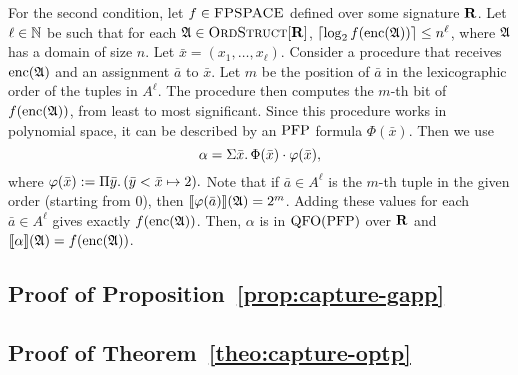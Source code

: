 For the second condition, let $f\in \text{\sc FPSPACE}$ defined over some signature $\mathbf{R}$.
Let $\ell\in\mathbb{N}$ be such that for each $\mathfrak{A}\in\text{\sc OrdStruct}[\mathbf{R}]$, $\lceil\log_2 f({\rm enc}(\mathfrak{A})) \rceil \leq n^\ell$, where $\mathfrak{A}$ has a domain of size $n$.
Let $\bar{x} = (x_1,\ldots,x_{\ell})$.
Consider a procedure that receives ${\rm enc}(\mathfrak{A})$ and an assignment $\bar{a}$ to $\bar{x}$. Let $m$ be the position of $\bar{a}$ in the lexicographic order of the tuples in $A^{\ell}$. The procedure then computes the $m$-th bit of $f({\rm enc}(\mathfrak{A}))$, from least to most significant. Since this procedure works in polynomial space, it can be described by an ${\rm PFP}$ formula $\Phi(\bar{x})$. Then we use
$$
\alpha = \Sigma{\bar{x}}.\, \Phi(\bar{x})\cdot\varphi(\bar{x}),
$$
where $\varphi(\bar{x}) := \Pi{\bar{y}}.\,(\bar{y} < \bar{x} \mapsto 2).$ Note that if $\bar{a} \in A^{\ell}$ is the $m$-th tuple in the given order (starting from 0), then ${\llbracket{}{\varphi(\bar{a})}\rrbracket}(\mathfrak{A}) = 2^{m}$. Adding these values for each $\bar{a}\in A^{\ell}$ gives exactly $f({\rm enc}(\mathfrak{A}))$. Then, $\alpha$ is in ${\rm QFO}({\rm PFP})$ over $\mathbf{R}$ and ${\llbracket{}{\alpha}\rrbracket}(\mathfrak{A}) = f({\rm enc}(\mathfrak{A}))$.


\subsection*{Proof of Proposition~\ref{prop:capture-gapp}}



\subsection*{Proof of Theorem~\ref{theo:capture-optp}}

